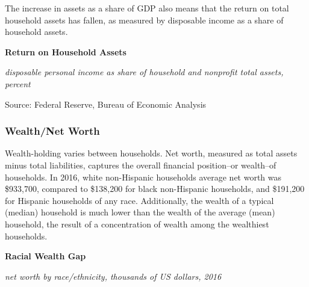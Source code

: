 \documentclass{report}
\makeatletter
\newcommand{\tbllink}[1]{\href{https://raw.githubusercontent.com/bdecon/US-chartbook/master/chartbook/data/#1}{\faTable}}
\newcommand*\short[1]{\expandafter\@gobbletwo\number\numexpr#1\relax}
\newcommand{\dateaxisticks}{
		date coordinates in=x, axis line style={draw=none},
		xmax={2020-10-01},
		max space between ticks=40,	    
		xtick={{1990-01-01}, {1992-01-01}, {1994-01-01}, 
			{1996-01-01}, {1998-01-01}, {2000-01-01}, 
			{2002-01-01}, {2004-01-01}, {2006-01-01},
			{2008-01-01}, {2010-01-01}, {2012-01-01}, {2014-01-01},
		    {2016-01-01}, {2018-01-01}, {2020-01-01}},
		minor xtick={{1989-01-01}, {1991-01-01}, {1993-01-01},
			{1995-01-01}, {1997-01-01}, {1999-01-01}, 
			{2001-01-01}, {2003-01-01}, {2005-01-01}, {2007-01-01},
		    {2009-01-01}, {2011-01-01}, {2013-01-01}, {2015-01-01},
		    {2017-01-01}, {2019-01-01}},
		enlarge y limits={0.06}, enlarge x limits={0.01},
		}
\newcommand{\bbar}[2]{extra #1 ticks = {{#2}}, extra #1 tick labels = ,
		extra #1 tick style = {grid=major, grid style={thick, black!25}},}
\newcommand{\stdline}[4]{\addplot[very thick, no markers, color=#1] 
		table [x=#2, y=#3, col sep=comma] {#4};	}
\newcommand{\rbars}{
		\fill[color=black!10] (axis cs:{1990-07-01},\pgfkeysvalueof{/pgfplots/ymin}) rectangle 
			(axis cs:{1991-03-01}, \pgfkeysvalueof{/pgfplots/ymax});
		\fill[color=black!10] (axis cs:{2007-12-01},\pgfkeysvalueof{/pgfplots/ymin}) rectangle 
			(axis cs:{2009-07-01}, \pgfkeysvalueof{/pgfplots/ymax});
		\fill[color=black!10] (axis cs:{2001-03-01},\pgfkeysvalueof{/pgfplots/ymin}) rectangle 
			(axis cs:{2001-11-01}, \pgfkeysvalueof{/pgfplots/ymax});
		\fill[color=black!10] (axis cs:{2020-02-01},\pgfkeysvalueof{/pgfplots/ymin}) rectangle 
			(axis cs:{2020-10-01}, \pgfkeysvalueof{/pgfplots/ymax});}
\makeatother
\begin{document}
{{{\begin{minipage}{0.76\textwidth}
\small The increase in assets as a share of GDP also means that the return on total household assets has fallen, as measured by disposable income as a share of household assets.  

\vspace{4mm}

\normalsize \textbf{Return on Household Assets}

\footnotesize{\textit{disposable personal income as share of household and nonprofit total assets, percent}}

\hspace*{-2mm} 

\footnotesize{Source: Federal Reserve, Bureau of Economic Analysis} \hfill \tbllink{dpish.csv}
\end{minipage}
\newpage
\begin{minipage}{0.76\textwidth}
\subsubsection*{\color{black!70} \seriffont Wealth/Net Worth}
\small Wealth-holding varies between households. Net worth, measured as total assets minus total liabilities, captures the overall financial position--or wealth--of households. In 2016, white non-Hispanic households average net worth was \$933,700, compared to \$138,200 for black non-Hispanic households, and \$191,200 for Hispanic households of any race. Additionally, the wealth of a typical (median) household is much lower than the wealth of the average (mean) household, the result of a concentration of wealth among the wealthiest households.

\vspace{3mm}

\normalsize \textbf{Racial Wealth Gap}

\footnotesize{\textit{net worth by race/ethnicity, thousands of US dollars, 2016}}
\vspace{3mm}


\end{minipage}}}}
\end{document}
